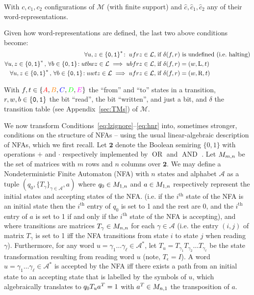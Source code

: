 With $c, c_1, c_2$ configurations of $\mathcal{M}$ (with finite support) and $\hat{c}, \hat{c}_1, \hat{c}_2$ any of their word-representations.


Given how word-representations are defined, the last two above conditions become:
\begin{align}
    \forall u,z\in\left\{\texttt{0},\texttt{1}\right\}^*\!: \; ufrz \in \mathcal{L},\;                                                             & \text{if $\delta(f,r)$ is undefined (i.e.~halting)} \label{eq:h0}
    \\
    \forall u,z\in\left\{\texttt{0},\texttt{1}\right\}^*,\,\forall b \in \left\{\texttt{0},\texttt{1}\right\}\!: utbwz \in \mathcal{L} \implies ubfrz \in \mathcal{L},\;     & \text{if $\delta(f,r) = (w,\text{L},t)$} \label{eq:hnl}
    \\
    \forall u,z\in\left\{\texttt{0},\texttt{1}\right\}^*,\,\forall b \in \left\{\texttt{0},\texttt{1}\right\}\!: u w t z \in \mathcal{L} \implies u f r z \in \mathcal{L},\; & \text{if $\delta(f,r) = (w,\text{R},t)$} \label{eq:hnr}
\end{align}

With $f,t \in \{\stateA,\stateB,\stateC,\stateD,\stateE\}$ the ``from'' and ``to'' states in a transition, $r,w,b \in \left\{\texttt{0},\texttt{1}\right\}$ the bit ``read'', the bit ``written'', and just a bit, and $\delta$ the transition table (see Appendix~\ref{sec:TMs}) of $\mathcal{M}$.


We now transform Conditions~\eqref{eq:lzignore}–\eqref{eq:hnr} into, sometimes stronger, conditions on the structure of NFAs -- using the usual linear-algebraic description of NFAs, which we first recall. Let $\mathbf{2}$ denote the Boolean semiring $\{0,1\}$ with operations $+$ and $\cdot$ respectively implemented by $\operatorname{OR}$ and $\operatorname{AND}$ \cite{CUNINGHAMEGREEN1991251}. Let $M_{m,n}$ be the set of matrices with $m$ rows and $n$ columns over $\mathbf{2}$. We may define a Nondeterministic Finite Automaton (NFA) with $n$ states and alphabet $\mathcal{A}$ as a tuple $(q_0, \{T_\gamma\}_{\gamma \in \mathcal{A}}, a)$ where $q_0 \in M_{1,n}$ and $a \in M_{1,n}$ respectively represent the initial states and accepting states of the NFA. (i.e. if the $i^\text{th}$ state of the NFA is an initial state then the $i^\text{th}$ entry of $q_0$ is set to 1 and the rest are 0, and the $i^\text{th}$ entry of $a$ is set to 1 if and only if the $i^\text{th}$ state of the NFA is accepting), and where transitions are matrices $T_\gamma\in M_{n,n}$ for each $\gamma\in\mathcal{A}$ (i.e. the entry $(i,j)$ of matrix $T_\gamma$ is set to 1 iff the NFA transitions from state $i$ to state $j$ when reading $\gamma$). Furthermore, for any word $u=\gamma_1\dots\gamma_\ell \in \mathcal{A}^*$, let $T_u = T_{\gamma_1} T_{\gamma_2} \dots T_{\gamma_\ell}$ be the state transformation resulting from reading word $u$ (note, $T_\epsilon = I$). A word $u=\gamma_1\dots\gamma_\ell \in \mathcal{A}^*$ is accepted by the NFA iff there exists a path from an initial state to an accepting state that is labelled by the symbols of $u$, which algebraically translates to $q_0 T_u a^{T} = 1$ with $a^{T} \in M_{n,1}$ the transposition of $a$.

